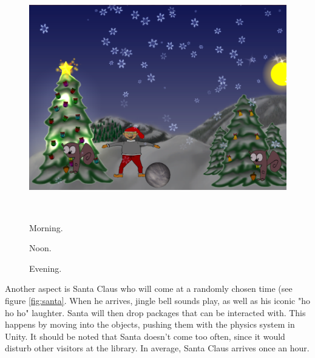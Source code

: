 \begin{figure}[htbp]
\begin{minipage}[b]{0.3\textwidth}
		\includegraphics[width=1.00\textwidth]{Pictures/Design/time3.png} %
	\end{minipage}\\ %
	\begin{minipage}[t]{0.3\textwidth}
		\caption{Morning.} %
		\label{fig:time1}
	\end{minipage}\hfill
	\begin{minipage}[t]{0.3\textwidth}
		\caption{Noon.} %
		\label{fig:time2}
	\end{minipage}\hfill	
	\begin{minipage}[t]{0.3\textwidth}
		\caption{Evening.} %
		\label{fig:time3}
	\end{minipage}
\end{figure}

Another aspect is Santa Claus who will come at a randomly chosen time (see figure \ref{fig:santa}. When he arrives, jingle bell sounds play, as well as his iconic "ho ho ho" laughter. Santa will then drop packages that can be interacted with. This happens by moving into the objects, pushing them with the physics system in Unity. It should be noted that Santa doesn't come too often, since it would disturb other visitors at the library. In average, Santa Claus arrives once an hour.

